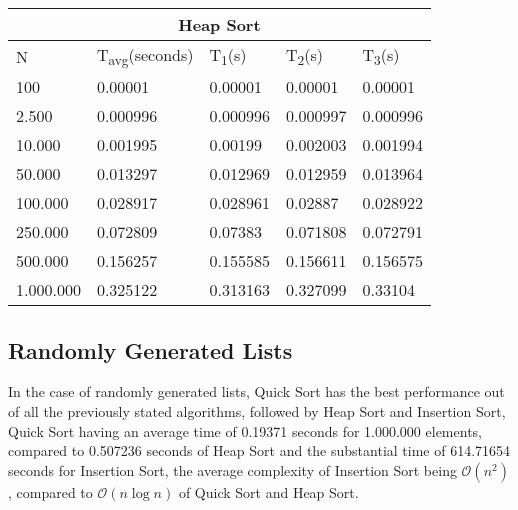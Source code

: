 \documentclass[]{article}
\begin{document}
\iffalse
	HEAP SORT
\fi


\begin{table}[H]
	\centering
\begin{tabular}{|l|l|l|l|l|}
\hline
\multicolumn{5}{|c|}{Heap Sort} \\ \hline
N & T\textsubscript{avg}(seconds) & T\textsubscript{1}(s) & T\textsubscript{2}(s) & T\textsubscript{3}(s) \\ \hline
100 & 0.00001 & 0.00001 & 0.00001 & 0.00001 \\ \hline
2.500 & 0.000996 & 0.000996 & 0.000997 & 0.000996 \\ \hline
10.000 & 0.001995 & 0.00199 & 0.002003 & 0.001994 \\ \hline
50.000 & 0.013297 & 0.012969 & 0.012959 & 0.013964 \\ \hline
100.000 & 0.028917 & 0.028961 & 0.02887 & 0.028922 \\ \hline
250.000 & 0.072809 & 0.07383 & 0.071808 & 0.072791 \\ \hline
500.000 & 0.156257 & 0.155585 & 0.156611 & 0.156575 \\ \hline
1.000.000 & 0.325122 & 0.313163 & 0.327099 & 0.33104 \\ \hline
\end{tabular}
\end{table}

	\pagebreak
	
	\subsection{Randomly Generated Lists}
In the case of randomly generated lists, Quick Sort has the best performance out of all the previously stated algorithms, followed by Heap Sort and Insertion Sort, Quick Sort having an average time of 0.19371 seconds for 1.000.000 elements, compared to 0.507236 seconds of Heap Sort and the substantial time of 614.71654 seconds for Insertion Sort, the average complexity of Insertion Sort being $\mathcal{O}(n^2)$, compared to $\mathcal{O}(n\log{}n)$ of Quick Sort and Heap Sort.
\end{document}

